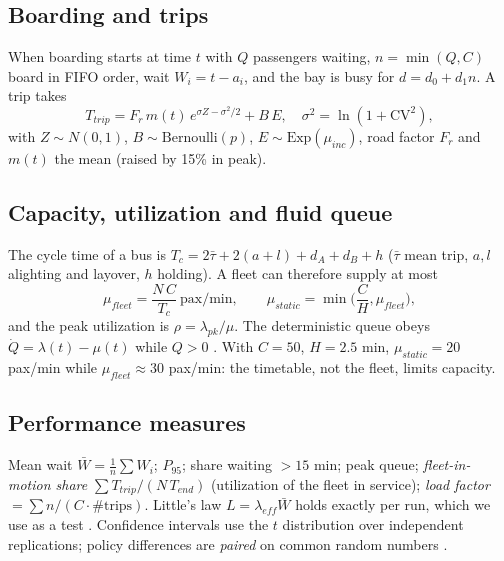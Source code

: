 \documentclass[10pt,twocolumn,letterpaper]{article}
\begin{document}
\subsection{Boarding and trips}
When boarding starts at time $t$ with $Q$ passengers waiting, $n=\min(Q,C)$ board in FIFO order, wait $W_i=t-a_i$, and the bay is
busy for $d=d_0+d_1 n$. A trip takes
\begin{equation}
T_{trip}=F_r\,m(t)\,e^{\sigma Z-\sigma^2/2}+B\,E,\quad \sigma^2=\ln(1+\mathrm{CV}^2),
\end{equation}
with $Z\sim N(0,1)$, $B\sim\text{Bernoulli}(p)$, $E\sim\text{Exp}(\mu_{inc})$, road factor $F_r$ and $m(t)$ the mean (raised by 15\% in peak).

\subsection{Capacity, utilization and fluid queue}
The cycle time of a bus is $T_c=2\bar\tau+2(a+l)+d_A+d_B+h$ ($\bar\tau$ mean trip, $a,l$ alighting and layover, $h$ holding).
A fleet can therefore supply at most
\begin{equation}
\mu_{fleet}=\frac{N\,C}{T_c}\ \text{pax/min},\qquad \mu_{static}=\min\!\Big(\frac{C}{H},\mu_{fleet}\Big),
\end{equation}
and the peak utilization is $\rho=\lambda_{pk}/\mu$. The deterministic queue obeys
$\dot Q=\lambda(t)-\mu(t)$ while $Q>0$ \cite{kleinrock}. With $C=50$, $H=2.5$ min, $\mu_{static}=20$ pax/min while $\mu_{fleet}\approx30$
pax/min: the timetable, not the fleet, limits capacity.

\subsection{Performance measures}
Mean wait $\bar W=\frac1n\sum W_i$; $P_{95}$; share waiting $>15$ min; peak queue; \emph{fleet-in-motion share}
$\sum T_{trip}/(N\,T_{end})$ (utilization of the fleet in service); \emph{load factor} $=\sum n/(C\cdot\#\text{trips})$. Little's law
$L=\lambda_{eff}\bar W$ holds exactly per run, which we use as a test \cite{little}. Confidence intervals use the $t$ distribution over
independent replications; policy differences are \emph{paired} on common random numbers \cite{law,banks}.
\end{document}
